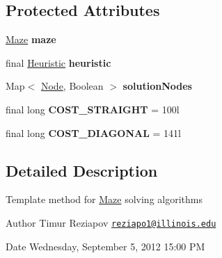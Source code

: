 \subsection*{Protected Attributes}
\begin{DoxyCompactItemize}
\item 
\hypertarget{classmazelib_1_1data_1_1_maze_solver_ade82d3652ee86f02ff0f16f8ddff5ea0}{\hyperlink{classmazelib_1_1data_1_1_maze}{Maze} {\bfseries maze}}\label{classmazelib_1_1data_1_1_maze_solver_ade82d3652ee86f02ff0f16f8ddff5ea0}

\item 
\hypertarget{classmazelib_1_1data_1_1_maze_solver_a8f57c9e54a2e368c429b11c5ba7707af}{final \hyperlink{interfacemazelib_1_1data_1_1_heuristic}{Heuristic} {\bfseries heuristic}}\label{classmazelib_1_1data_1_1_maze_solver_a8f57c9e54a2e368c429b11c5ba7707af}

\item 
\hypertarget{classmazelib_1_1data_1_1_maze_solver_a089ceaab209320b6df17dd27f4d58eae}{Map$<$ \hyperlink{classmazelib_1_1data_1_1_node}{Node}, Boolean $>$ {\bfseries solution\-Nodes}}\label{classmazelib_1_1data_1_1_maze_solver_a089ceaab209320b6df17dd27f4d58eae}

\item 
\hypertarget{classmazelib_1_1data_1_1_maze_solver_ac6f12a1f0ad8e35ffae101a5ec7cabfd}{final long {\bfseries C\-O\-S\-T\-\_\-\-S\-T\-R\-A\-I\-G\-H\-T} = 100l}\label{classmazelib_1_1data_1_1_maze_solver_ac6f12a1f0ad8e35ffae101a5ec7cabfd}

\item 
\hypertarget{classmazelib_1_1data_1_1_maze_solver_a161ad7fae780c4e07703d87508657304}{final long {\bfseries C\-O\-S\-T\-\_\-\-D\-I\-A\-G\-O\-N\-A\-L} = 141l}\label{classmazelib_1_1data_1_1_maze_solver_a161ad7fae780c4e07703d87508657304}

\end{DoxyCompactItemize}


\subsection{Detailed Description}
Template method for \hyperlink{classmazelib_1_1data_1_1_maze}{Maze} solving algorithms \begin{DoxyAuthor}{Author}
Timur Reziapov \href{mailto:reziapo1@illinois.edu}{\tt reziapo1@illinois.\-edu} 
\end{DoxyAuthor}
\begin{DoxyDate}{Date}
Wednesday, September 5, 2012 15\-:00 P\-M 
\end{DoxyDate}


